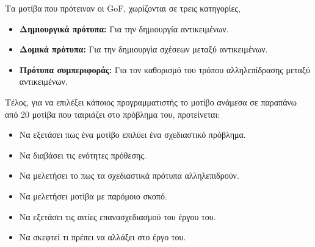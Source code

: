 \par
Τα μοτίβα που πρότειναν οι GoF, χωρίζονται σε τρεις κατηγορίες, 
\begin{itemize}
    \item \textbf{Δημιουργικά πρότυπα:} Για την δημιουργία αντικειμένων.
    \item \textbf{Δομικά πρότυπα:} Για την δημιουργία σχέσεων μεταξύ αντικειμένων.
    \item \textbf{Πρότυπα συμπεριφοράς:} Για τον καθορισμό του τρόπου αλληλεπίδρασης μεταξύ αντικειμένων.
\end{itemize}
\par
Τέλος, για να επιλέξει κάποιος προγραμματιστής το μοτίβο ανάμεσα σε παραπάνω από 
20 μοτίβα που ταιριάζει στο πρόβλημα του, προτείνεται: 
\begin{itemize}
    \item Να εξετάσει πως ένα μοτίβο επιλύει ένα σχεδιαστικό πρόβλημα.
    \item Να διαβάσει τις ενότητες πρόθεσης.
    \item Να μελετήσει το πως τα σχεδιαστικά πρότυπα αλληλεπιδρούν.
    \item Να μελετήσει μοτίβα με παρόμοιο σκοπό.
    \item Να εξετάσει τις αιτίες επανασχεδιασμού του έργου του.
    \item Να σκεφτεί τι πρέπει να αλλάξει στο έργο του.
\end{itemize}
